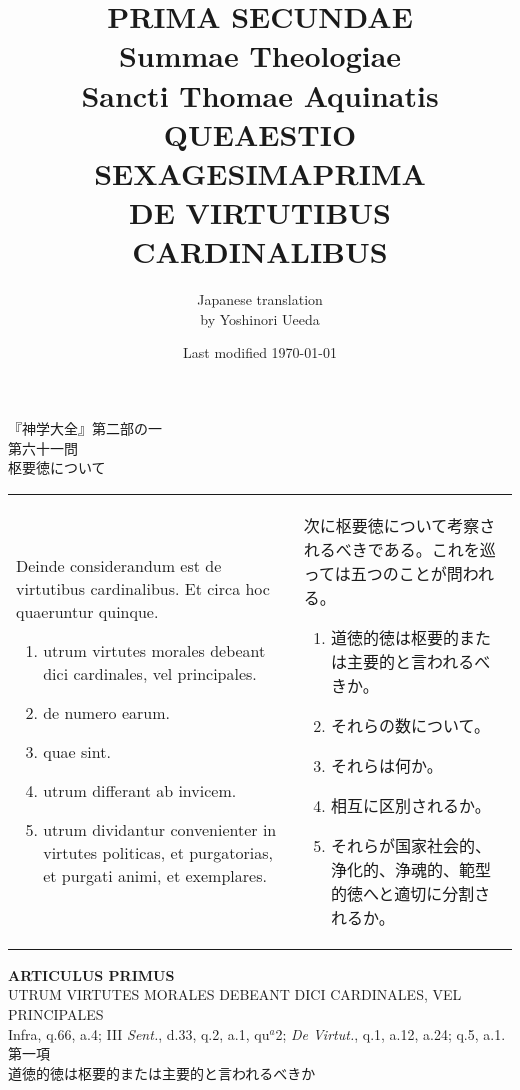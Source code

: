 \documentclass[10pt]{jsarticle}
\title{{\bf PRIMA SECUNDAE}\\{\HUGE Summae Theologiae}\\Sancti Thomae
Aquinatis\\{\sffamily QUEAESTIO SEXAGESIMAPRIMA}\\DE VIRTUTIBUS CARDINALIBUS}
\author{Japanese translation\\by Yoshinori {\sc Ueeda}}
\date{Last modified \today}
\begin{document}
\maketitle
\thispagestyle{empty}

\begin{center}
{\LARGE 『神学大全』第二部の一}\\
{\Large 第六十一問\\枢要徳について}
\end{center}

\begin{longtable}{p{21em}p{21em}}

Deinde considerandum est de virtutibus cardinalibus. Et circa hoc quaeruntur quinque.  
\begin{enumerate}
 \item utrum virtutes morales debeant dici cardinales, vel principales.
 \item de numero earum.
 \item quae sint.
 \item utrum differant ab invicem.
 \item utrum dividantur convenienter in virtutes politicas, et purgatorias, et purgati animi, et exemplares.
\end{enumerate}

&

 次に枢要徳について考察されるべきである。これを巡っては五つのことが問われる。  

\begin{enumerate}
 \item 道徳的徳は枢要的または主要的と言われるべきか。
 \item それらの数について。
 \item それらは何か。
 \item 相互に区別されるか。
 \item それらが国家社会的、浄化的、浄魂的、範型的徳へと適切に分割されるか。
\end{enumerate}
\end{longtable}



\newpage


\begin{center}
{\Large {\bf ARTICULUS PRIMUS}}\\
{\large UTRUM VIRTUTES MORALES DEBEANT DICI CARDINALES, VEL PRINCIPALES}\\
{\footnotesize Infra, q.66, a.4; III {\itshape Sent.}, d.33, q.2, a.1, qu$^{a}$2; {\itshape De Virtut.}, q.1, a.12, a.24; q.5, a.1.}\\
{\Large 第一項\\道徳的徳は枢要的または主要的と言われるべきか}
\end{center}
\end{document}
